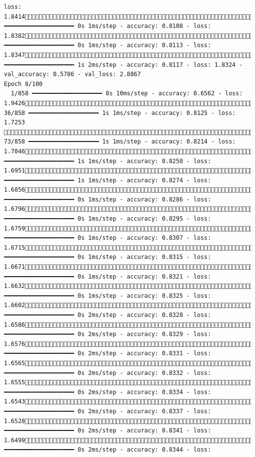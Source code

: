 \documentclass[
  letterpaper,
  DIV=11,
  numbers=noendperiod]{scrartcl}
\begin{document}
\begin{verbatim}
loss: 1.8414796/858 ━━━━━━━━━━━━━━━━━━━━ 0s 1ms/step - accuracy: 0.8108 - loss: 1.8382833/858 ━━━━━━━━━━━━━━━━━━━━ 0s 1ms/step - accuracy: 0.8113 - loss: 1.8347858/858 ━━━━━━━━━━━━━━━━━━━━ 1s 2ms/step - accuracy: 0.8117 - loss: 1.8324 - val_accuracy: 0.5786 - val_loss: 2.8867
Epoch 8/100
  1/858 ━━━━━━━━━━━━━━━━━━━━ 8s 10ms/step - accuracy: 0.6562 - loss: 1.9426 36/858 ━━━━━━━━━━━━━━━━━━━━ 1s 1ms/step - accuracy: 0.8125 - loss: 1.7253  73/858 ━━━━━━━━━━━━━━━━━━━━ 1s 1ms/step - accuracy: 0.8214 - loss: 1.7046110/858 ━━━━━━━━━━━━━━━━━━━━ 1s 1ms/step - accuracy: 0.8250 - loss: 1.6951145/858 ━━━━━━━━━━━━━━━━━━━━ 1s 1ms/step - accuracy: 0.8274 - loss: 1.6856179/858 ━━━━━━━━━━━━━━━━━━━━ 0s 1ms/step - accuracy: 0.8286 - loss: 1.6796214/858 ━━━━━━━━━━━━━━━━━━━━ 0s 1ms/step - accuracy: 0.8295 - loss: 1.6759250/858 ━━━━━━━━━━━━━━━━━━━━ 0s 1ms/step - accuracy: 0.8307 - loss: 1.6715286/858 ━━━━━━━━━━━━━━━━━━━━ 0s 1ms/step - accuracy: 0.8315 - loss: 1.6671318/858 ━━━━━━━━━━━━━━━━━━━━ 0s 1ms/step - accuracy: 0.8321 - loss: 1.6632340/858 ━━━━━━━━━━━━━━━━━━━━ 0s 1ms/step - accuracy: 0.8325 - loss: 1.6602351/858 ━━━━━━━━━━━━━━━━━━━━ 0s 2ms/step - accuracy: 0.8328 - loss: 1.6586358/858 ━━━━━━━━━━━━━━━━━━━━ 0s 2ms/step - accuracy: 0.8329 - loss: 1.6576366/858 ━━━━━━━━━━━━━━━━━━━━ 0s 2ms/step - accuracy: 0.8331 - loss: 1.6565373/858 ━━━━━━━━━━━━━━━━━━━━ 0s 2ms/step - accuracy: 0.8332 - loss: 1.6555381/858 ━━━━━━━━━━━━━━━━━━━━ 0s 2ms/step - accuracy: 0.8334 - loss: 1.6543392/858 ━━━━━━━━━━━━━━━━━━━━ 0s 2ms/step - accuracy: 0.8337 - loss: 1.6528413/858 ━━━━━━━━━━━━━━━━━━━━ 0s 2ms/step - accuracy: 0.8341 - loss: 1.6499432/858 ━━━━━━━━━━━━━━━━━━━━ 0s 2ms/step - accuracy: 0.8344 - loss: 
\end{verbatim}
\end{document}
